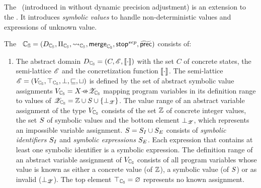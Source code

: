 \subsection{\SymbolicValueAnalysisCPA}
The \symbolicValueAnalysisCPA\ (introduced in \cite{Lemberger2015} without dynamic precision adjustment) is an extension to the . It introduces \emph{symbolic values} to handle non-deterministic values and expressions of unknown value.

The \symbolicValueAnalysisCPA\ $\mathbb{C_{S}} = (D_{\mathbb{C_{S}}}, \Pi_{\mathbb{C_{S}}}, \rightsquigarrow_{\mathbb{C_{S}}}, \operatorname{\operatorname{\mathsf{merge}}}_{\mathbb{C_{S}}}, \operatorname{\operatorname{\mathsf{stop}}}^{sep}, \operatorname{\widetilde{\operatorname{\operatorname{\mathsf{prec}}}}})$ consists of:
\begin{enumerate}[leftmargin=*, label=\arabic*.]
\item The abstract domain $D_{\mathbb{C_{S}}} = (C, \mathscr{E}, \llbracket \cdot \rrbracket)$ with the set $C$ of concrete states,
	the semi-lattice $\mathscr{E}$ and
	the concretization function $\llbracket \cdot \rrbracket$.
	The semi-lattice $\mathscr{E} = (V_{\mathbb{C_{S}}}, \top_{\mathbb{C_{S}}}, \bot, \sqsubseteq, \sqcup)$ is defined by
	the set of abstract symbolic value assignments $\symvalAssignment = X \partialFunc \symvalset$ mapping program variables in its definition range to values of
	${\mathscr{Z}_{\mathbb{C_{S}}}} = \mathbb{Z} \cup S \cup \{ \bot_{\mathscr{Z}} \}$.
	The value range of an abstract variable assignment of the type $V_{\mathbb{C_{S}}}$ consists of the set $\mathbb{Z}$ of concrete integer values,
	the set $S$ of symbolic values and the bottom element $\bot_{\mathscr{Z}}$, which represents an impossible variable assignment.
	$S = S_I \cup S_E$ consists of \emph{symbolic identifiers} $S_I$ and \emph{symbolic expressions} $S_E$.
	Each expression that contains at least one symbolic identifier is a symbolic expression.
	The definition range of an abstract variable assignment of $V_{\mathbb{C_{S}}}$ consists of all program variables whose value is known as either a concrete value (of $\mathbb{Z}$),
	a symbolic value (of $S$) or as invalid ($\bot_{\mathscr{Z}}$).
	The top element $\top_{\mathbb{C_{S}}} = \varnothing$ represents no known assignment.


\end{enumerate}
